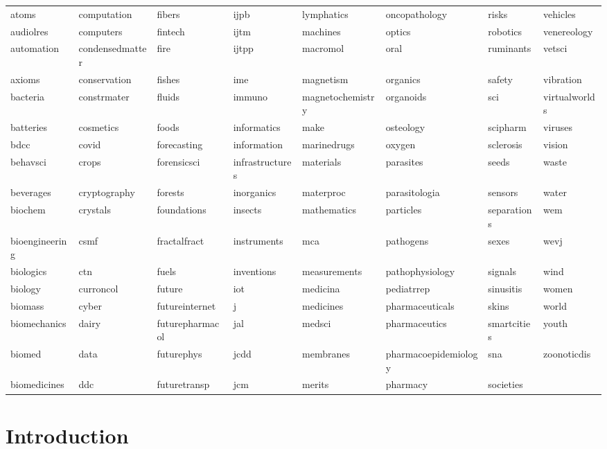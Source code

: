 \documentclass[
]{article}
\begin{document}
\begin{longtable}[t]{llllllll}
atoms & computation & fibers & ijpb & lymphatics & oncopathology & risks & vehicles\\
\addlinespace
audiolres & computers & fintech & ijtm & machines & optics & robotics & venereology\\
automation & condensedmatter & fire & ijtpp & macromol & oral & ruminants & vetsci\\
axioms & conservation & fishes & ime & magnetism & organics & safety & vibration\\
bacteria & constrmater & fluids & immuno & magnetochemistry & organoids & sci & virtualworlds\\
batteries & cosmetics & foods & informatics & make & osteology & scipharm & viruses\\
\addlinespace
bdcc & covid & forecasting & information & marinedrugs & oxygen & sclerosis & vision\\
behavsci & crops & forensicsci & infrastructures & materials & parasites & seeds & waste\\
beverages & cryptography & forests & inorganics & materproc & parasitologia & sensors & water\\
biochem & crystals & foundations & insects & mathematics & particles & separations & wem\\
bioengineering & csmf & fractalfract & instruments & mca & pathogens & sexes & wevj\\
\addlinespace
biologics & ctn & fuels & inventions & measurements & pathophysiology & signals & wind\\
biology & curroncol & future & iot & medicina & pediatrrep & sinusitis & women\\
biomass & cyber & futureinternet & j & medicines & pharmaceuticals & skins & world\\
biomechanics & dairy & futurepharmacol & jal & medsci & pharmaceutics & smartcities & youth\\
biomed & data & futurephys & jcdd & membranes & pharmacoepidemiology & sna & zoonoticdis\\
\addlinespace
biomedicines & ddc & futuretransp & jcm & merits & pharmacy & societies & \\
\bottomrule
\end{longtable}
\finishlandscape

\hypertarget{introduction}{%
\section{Introduction}\label{introduction}}
\end{document}
